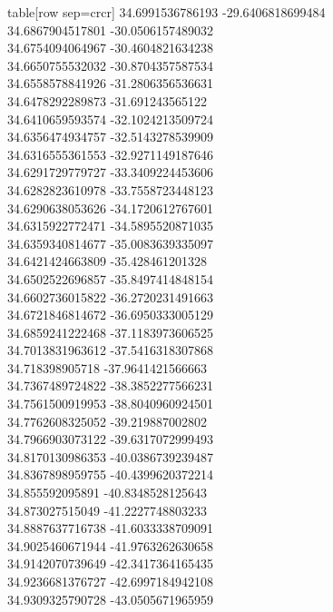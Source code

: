   table[row sep=crcr]{%
34.6991536786193	-29.6406818699484\\
34.6867904517801	-30.0506157489032\\
34.6754094064967	-30.4604821634238\\
34.6650755532032	-30.8704357587534\\
34.6558578841926	-31.2806356536631\\
34.6478292289873	-31.691243565122\\
34.6410659593574	-32.1024213509724\\
34.6356474934757	-32.5143278539909\\
34.6316555361553	-32.9271149187646\\
34.6291729779727	-33.3409224453606\\
34.6282823610978	-33.7558723448123\\
34.6290638053626	-34.1720612767601\\
34.6315922772471	-34.5895520871035\\
34.6359340814677	-35.0083639335097\\
34.6421424663809	-35.428461201328\\
34.6502522696857	-35.8497414848154\\
34.6602736015822	-36.2720231491663\\
34.6721846814672	-36.6950333005129\\
34.6859241222468	-37.1183973606525\\
34.7013831963612	-37.5416318307868\\
34.718398905718	-37.9641421566663\\
34.7367489724822	-38.3852277566231\\
34.7561500919953	-38.8040960924501\\
34.7762608325052	-39.219887002802\\
34.7966903073122	-39.6317072999493\\
34.8170130986353	-40.0386739239487\\
34.8367898959755	-40.4399620372214\\
34.855592095891	-40.8348528125643\\
34.873027515049	-41.2227748803233\\
34.8887637716738	-41.6033338709091\\
34.9025460671944	-41.9763262630658\\
34.9142070739649	-42.3417364165435\\
34.9236681376727	-42.6997184942108\\
34.9309325790728	-43.0505671965959\\
}
